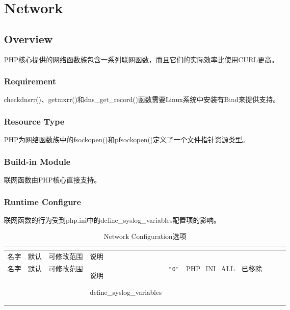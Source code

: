\part{Network}



\chapter{Overview}



PHP核心提供的网络函数族包含一系列联网函数，而且它们的实际效率比使用CURL更高。

\section{Requirement}

checkdnsrr()、getmxrr()和dns\_get\_record()函数需要Linux系统中安装有Bind来提供支持。

\section{Resource Type}

PHP为网络函数族中的fsockopen()和pfsockopen()定义了一个文件指针资源类型。


\section{Build-in Module}

联网函数由PHP核心直接支持。

\section{Runtime Configure}

联网函数的行为受到php.ini中的define\_syslog\_variables配置项的影响。



\begin{longtable}{|m{100pt}|m{30pt}|m{50pt}|m{100pt}|}
\tabularnewline\hline
名字&默认&可修改范围&说明
\endhead

\caption{Network Configuration选项}\\
\hline
名字&默认&可修改范围&说明
\endfirsthead

\endfoot

\endlastfoot
\hline
define\_syslog\_variables&\texttt{"0"}&PHP\_INI\_ALL&已移除\\
\hline
\end{longtable}

